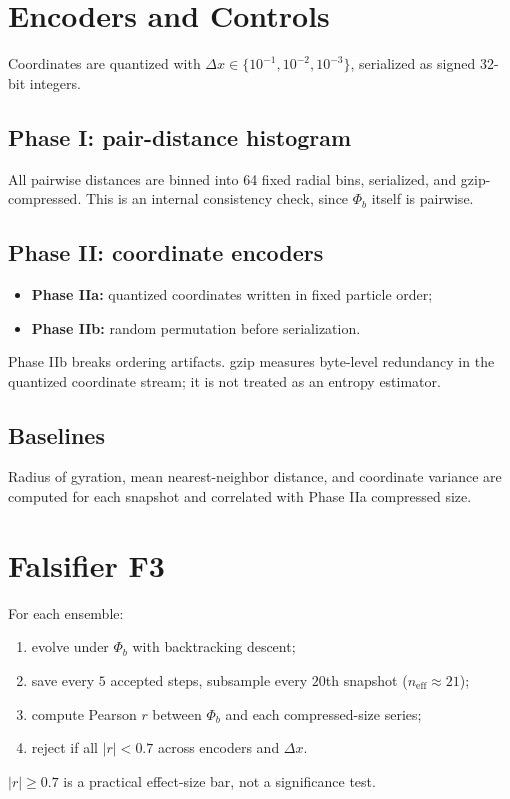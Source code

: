 \documentclass[11pt,a4paper]{article}
\numberwithin{equation}{section}
\newcommand{\phib}{\Phi_b}
\begin{document}
\section{Encoders and Controls}
Coordinates are quantized with $\Delta x\!\in\!\{10^{-1},10^{-2},10^{-3}\}$, serialized as signed 32-bit integers.

\subsection{Phase I: pair-distance histogram}
All pairwise distances are binned into 64 fixed radial bins, serialized, and gzip-compressed.  This is an internal consistency check, since $\phib$ itself is pairwise.

\subsection{Phase II: coordinate encoders}
\begin{itemize}
\item \textbf{Phase IIa:} quantized coordinates written in fixed particle order;
\item \textbf{Phase IIb:} random permutation before serialization.
\end{itemize}
Phase IIb breaks ordering artifacts.  gzip measures byte-level redundancy in the quantized coordinate stream; it is not treated as an entropy estimator.

\subsection{Baselines}
Radius of gyration, mean nearest-neighbor distance, and coordinate variance are computed for each snapshot and correlated with Phase IIa compressed size.

\section{Falsifier F3}
For each ensemble:
\begin{enumerate}[label=(\alph*)]
\item evolve under $\phib$ with backtracking descent;
\item save every $5$ accepted steps, subsample every $20$th snapshot ($n_\text{eff}\!\approx\!21$);
\item compute Pearson $r$ between $\phib$ and each compressed-size series;
\item reject if all $|r|<0.7$ across encoders and $\Delta x$.
\end{enumerate}
$|r|\ge0.7$ is a practical effect-size bar, not a significance test.
\end{document}
